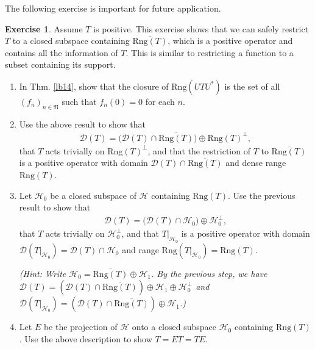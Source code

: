 \documentclass[12pt,a4paper,notitlepage]{article}
\theoremstyle{definition}
\newtheorem{exe}[df]{Exercise}
\theoremstyle{plain}
\newcommand{\fk}{\mathfrak}
\newcommand{\mc}{\mathcal}
\newcommand{\ovl}{\overline}
\newcommand{\Dom}{\scr D}
\newcommand{\scr}{\mathscr}
\newcommand{\Rng}{\mathrm{Rng}}
\numberwithin{equation}{section}
\begin{document}
The following exercise is important for future application.

\begin{exe}\label{lb15}
Assume $T$ is positive. This exercise shows that we can safely restrict $T$ to a closed subspace containing $\ovl{\Rng(T)}$, which is a positive operator and contains all the information of $T$. This is similar to restricting a function to a subset containing its support.
\begin{enumerate}
\item In Thm. \ref{lb14}, show that the closure of $\Rng(UTU^*)$ is the set of all $(f_n)_{n\in\fk N}$ such that $f_n(0)=0$ for each $n$.
\item Use the above result to show that 
\begin{align*}
\Dom(T)=\big(\Dom(T)\cap\ovl{\Rng(T)}\big)\oplus \Rng(T)^\perp,	
\end{align*}
that $T$ acts trivially on $\Rng(T)^\perp$, and that the restriction of  $T$ to $\ovl{\Rng(T)}$ is a positive operator with domain $\Dom(T)\cap\ovl{\Rng(T)}$ and dense range $\Rng(T)$.
\item Let $\mc H_0$ be a closed subspace of $\mc H$ containing $\Rng(T)$. Use the previous result to show that
\begin{align*}
\Dom(T)=\big(\Dom(T)\cap \mc H_0\big)\oplus\mc H_0^\perp,	
\end{align*}
that $T$ acts trivially on $\mc H_0^\perp$, and that $T|_{\mc H_0}$ is a positive operator with domain $\Dom(T|_{\mc H_0})=\Dom(T)\cap \mc H_0$ and range $\Rng(T|_{\mc H_0})=\Rng(T)$.

\textit{(Hint: Write $\mc H_0=\ovl{\Rng(T)}\oplus\mc H_1$. By the previous step, we have  $\Dom(T)=(\Dom(T)\cap\ovl{\Rng(T)})\oplus\mc H_1\oplus\mc H_0^\perp$ and $\Dom(T|_{\mc H_0})=(\Dom(T)\cap\ovl{\Rng(T)})\oplus\mc H_1$.)}
\item  Let $E$ be the projection of $\mc H$ onto a closed subspace $\mc H_0$ containing $\Rng(T)$. Use the above description to show $T=ET=TE$.
\end{enumerate}

\end{exe}
\end{document}
